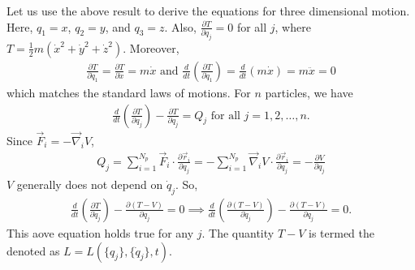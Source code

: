 Let us use the above result to derive the equations for three dimensional motion. Here, $q_{1} = x$, $q_{2} = y$, and $q_{3} = z$. Also, $\frac{\partial T}{\partial q_{j}} = 0$ for all $j$, where $T = \frac{1}{2}m(\dot{x}^{2}+\dot{y}^{2}+\dot{z}^{2})$. Moreover,
\begin{align}
    \frac{\partial T}{\partial \dot{q}_{1}} = \frac{\partial T}{\partial \dot{x}} = m\dot{x} \text{ and } \frac{d}{dt} \left( \frac{\partial T}{\partial \dot{q}_{1}} \right) = \frac{d}{dt}(m\dot{x}) = m\ddot{x} = 0 
\end{align}
which matches the standard laws of motions. For $n$ particles, we have
\begin{align}
    \frac{d}{dt} \left( \frac{\partial T}{\partial q_{j}} \right) - \frac{\partial T}{\partial q_{j}} = Q_{j} \text{ for all } j = 1,2,\ldots,n.
\end{align}
Since $\vec{F}_{i} = -\vec{\nabla}_{i} V$,
\begin{align}
    Q_{j} = \sum_{i=1}^{N_{p}} \vec{F}_{i} \cdot \frac{\partial \vec{r}_{i}}{\partial q_{j}} = -\sum_{i=1}^{N_{p}} \vec{\nabla}_{i} V \cdot \frac{\partial \vec{r}_{i}}{\partial q_{j}} = -\frac{\partial V}{\partial q_{j}}
\end{align}
$V$ generally does not depend on $\dot{q}_{j}$. So,
\begin{align}
    \frac{d}{dt} \left( \frac{\partial T}{\partial \dot{q}_{j}} \right) - \frac{\partial(T-V)}{\partial q_{j}} = 0 \implies \frac{d}{dt} \left( \frac{\partial(T-V)}{\partial \dot{q}_{j}} \right) - \frac{\partial(T-V)}{\partial q_{j}} = 0.
\end{align}
This aove equation holds true for any $j$. The quantity $T-V$ is termed the  denoted as $L = L(\{q_{j}\},\{\dot{q}_{j}\},t)$.

